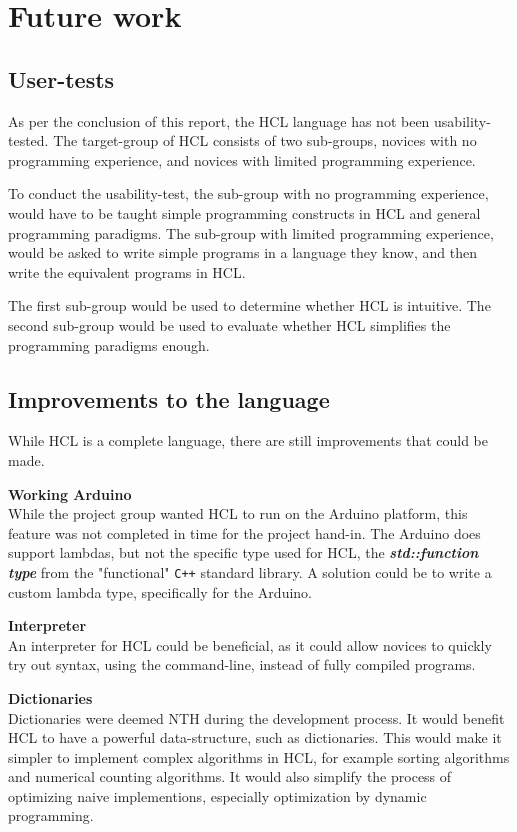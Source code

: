 \section{Future work}
\label{sec:futureWorks}

\subsection{User-tests}
As per the conclusion of this report, the HCL language has not been usability-tested.
The target-group of HCL consists of two sub-groups, novices with no programming experience, and novices with limited programming experience.

To conduct the usability-test, the sub-group with no programming experience, would have to be taught simple programming constructs in HCL and general programming paradigms.
The sub-group with limited programming experience, would be asked to write simple programs in a language they know, and then write the equivalent programs in HCL.

The first sub-group would be used to determine whether HCL is intuitive.
The second sub-group would be used to evaluate whether HCL simplifies the programming paradigms enough.

\subsection{Improvements to the language}
While HCL is a complete language, there are still improvements that could be made.

\textbf{Working Arduino}\\
While the project group wanted HCL to run on the Arduino platform, this feature was not completed in time for the project hand-in.
The Arduino does support lambdas, but not the specific type used for HCL, the \textit{\textbf{std::function type}} from the "functional" \texttt{C++} standard library.
A solution could be to write a custom lambda type, specifically for the Arduino.

\textbf{Interpreter}\\
An interpreter for HCL could be beneficial, as it could allow novices to quickly try out syntax, using the command-line, instead of fully compiled programs.

\textbf{Dictionaries}\\
Dictionaries were deemed NTH during the development process.
It would benefit HCL to have a powerful data-structure, such as dictionaries.
This would make it simpler to implement complex algorithms in HCL, for example sorting algorithms and numerical counting algorithms.
It would also simplify the process of optimizing naive implementions, especially optimization by dynamic programming.

